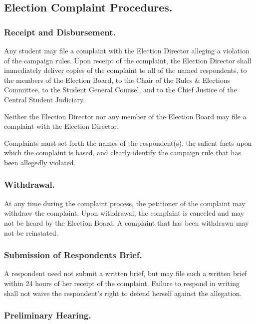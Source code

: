 \subsection{Election Complaint Procedures.}

\subsubsection{Receipt and Disbursement.}

\subsubsubsection{}
Any student may file a complaint with the Election Director alleging a violation of the campaign rules.  Upon receipt of the complaint, the Election Director shall immediately deliver copies of the complaint to all of the named respondents, to the members of the Election Board, to the Chair of the Rules \& Elections Committee, to the Student General Counsel, and to the Chief Justice of the Central Student Judiciary.

\subsubsubsection{}
Neither the Election Director nor any member of the Election Board may file a complaint with the Election Director.

\subsubsubsection{}
Complaints must set forth the names of the respondent(s), the salient facts upon which the complaint is based, and clearly identify the campaign rule that has been allegedly violated.

\subsubsection{Withdrawal.}
At any time during the complaint process, the petitioner of the complaint may withdraw the complaint.  Upon withdrawal, the complaint is canceled and may not be heard by the Election Board.  A complaint that has been withdrawn may not be reinstated.

\subsubsection{Submission of Respondents Brief.}
A respondent need not submit a written brief, but may file such a written brief within 24 hours of her receipt of the complaint.  Failure to respond in writing shall not waive the respondent's right to defend herself against the allegation.

\subsubsection{Preliminary Hearing.}  

